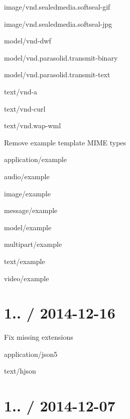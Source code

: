\begin{DoxyItemize}
\begin{DoxyItemize}
\item {\ttfamily image/vnd.\+sealedmedia.\+softseal-\/gif}
\item {\ttfamily image/vnd.\+sealedmedia.\+softseal-\/jpg}
\item {\ttfamily model/vnd-\/dwf}
\item {\ttfamily model/vnd.\+parasolid.\+transmit-\/binary}
\item {\ttfamily model/vnd.\+parasolid.\+transmit-\/text}
\item {\ttfamily text/vnd-\/a}
\item {\ttfamily text/vnd-\/curl}
\item {\ttfamily text/vnd.\+wap-\/wml}
\end{DoxyItemize}
\item Remove example template M\+I\+ME types
\begin{DoxyItemize}
\item {\ttfamily application/example}
\item {\ttfamily audio/example}
\item {\ttfamily image/example}
\item {\ttfamily message/example}
\item {\ttfamily model/example}
\item {\ttfamily multipart/example}
\item {\ttfamily text/example}
\item {\ttfamily video/example}
\end{DoxyItemize}
\end{DoxyItemize}

\section*{1.. / 2014-\/12-\/16 }


\begin{DoxyItemize}
\item Fix missing extensions
\begin{DoxyItemize}
\item {\ttfamily application/json5}
\item {\ttfamily text/hjson}
\end{DoxyItemize}
\end{DoxyItemize}

\section*{1.. / 2014-\/12-\/07 }


